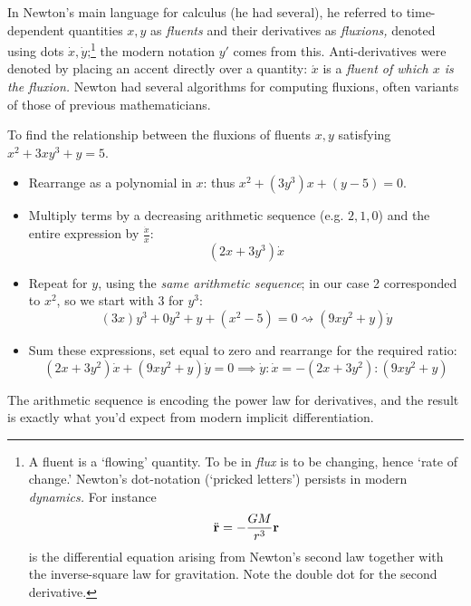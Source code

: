 % 





 In Newton's main language for calculus (he had several), he referred to time-dependent quantities $x,y$ as \emph{fluents} and their derivatives as \emph{fluxions,} denoted using dots $\dot x,\dot y$;\footnote{A fluent is a `flowing' quantity. To be in \emph{flux} is to be changing, hence `rate of change.' Newton's dot-notation (`pricked letters') persists in modern \emph{dynamics.} For instance
\[\ddot{{\mathbf{r}}}=-\frac{GM}{r^3}{\mathbf{r}}\]
is the differential equation arising from Newton's second law together with the inverse-square law for gravitation. Note the double dot for the second derivative.} the modern notation $y'$ comes from this. Anti-derivatives were denoted by placing an accent directly over a quantity: $\acute{x}$ is a \emph{fluent of which $x$ is the fluxion.} Newton had several algorithms for computing fluxions, often variants of those of previous mathematicians.

 To find the relationship between the fluxions of fluents $x,y$ satisfying $x^2+3xy^3+y=5$.
\begin{itemize}\itemsep0pt
  \item Rearrange as a polynomial in $x$: thus $x^2+(3y^3)x+(y-5)=0$.
  \item Multiply terms by a decreasing arithmetic sequence (e.g.{} $2,1,0$) and the entire expression by $\frac{\dot x}x$:
  \[(2x+3y^3)\dot x\] 
  \item Repeat for $y$, using the \emph{same arithmetic sequence}; in our case 2 corresponded to $x^2$, so we start with 3 for $y^3$:
  \[(3x)y^3+0y^2+y+(x^2-5)=0\rightsquigarrow (9xy^2+y)\dot y\]
  \item Sum these expressions, set equal to zero and rearrange for the required ratio:
  \[(2x+3y^2)\dot x+(9xy^2+y)\dot y=0 \implies \dot y:\dot x = -(2x+3y^2):(9xy^2+y)\]
\end{itemize}
The arithmetic sequence is encoding the power law for derivatives, and the result is exactly what you'd expect from modern implicit differentiation.


